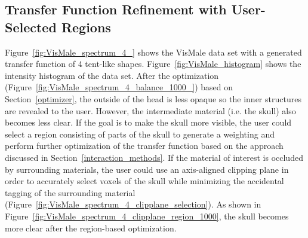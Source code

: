 \subsection{Transfer Function Refinement with User-Selected Regions \label{transfer_function_refinement_with_user-selected_regions}}
Figure~\ref{fig:VisMale_spectrum_4_} shows the VisMale data set with a generated transfer function of 4 tent-like shapes. Figure~\ref{fig:VisMale_histogram} shows the intensity histogram of the data set.
After the optimization (Figure~\ref{fig:VisMale_spectrum_4_balance_1000_}) based on Section~\ref{optimizer}, the outside of the head is less opaque so the inner structures are revealed to the user. However, the intermediate material (i.e. the skull) also becomes less clear. If the goal is to make the skull more visible, the user could select a region consisting of parts of the skull to generate a weighting and perform further optimization of the transfer function based on the approach discussed in Section~\ref{interaction_methods}. If the material of interest is occluded by surrounding materials, the user could use an axis-aligned clipping plane in order to accurately select voxels of the skull while minimizing the accidental tagging of the surrounding material (Figure~\ref{fig:VisMale_spectrum_4_clipplane_selection}).
As shown in Figure~\ref{fig:VisMale_spectrum_4_clipplane_region_1000}, the skull becomes more clear after the region-based optimization.

%

